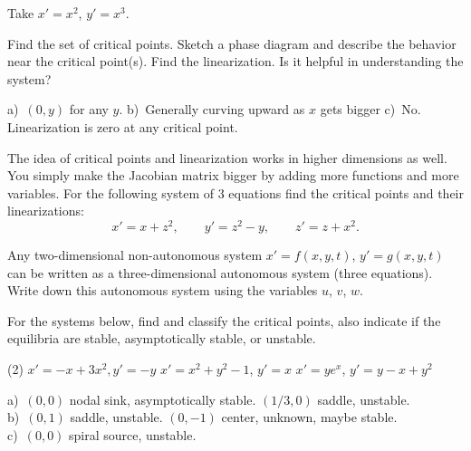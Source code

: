 \begin{exercise}
Take $x'=x^2$, \enspace $y'=x^3$.
\begin{tasks}
\task Find the set of critical points.
\task Sketch a phase diagram and describe the behavior near the critical
point(s).
\task Find the linearization.  Is it helpful in understanding the system?
\end{tasks}
\end{exercise}
\comboSol{%
}
{%
a)~$(0,y)$ for any $y$. \quad b)~Generally curving upward as $x$ gets bigger \quad c)~No. Linearization is zero at any critical point.
}

\begin{samepage}
\begin{exercise}\ansMark%
The idea of critical points and linearization works in higher dimensions as
well.  You simply make the Jacobian matrix bigger by adding more functions
and more variables.  For the following system
of 3 equations find the critical points and their linearizations:
\begin{equation*}
x' = x + z^2, \qquad y' = z^2-y, \qquad z' = z+x^2.
\end{equation*}
\end{exercise}
\end{samepage}

\begin{exercise}\ansMark%
Any two-dimensional non-autonomous system $x'=f(x,y,t)$, $y'=g(x,y,t)$ can
be written as a three-dimensional autonomous system (three equations).  Write down this
autonomous system using the variables $u$, $v$, $w$.
\end{exercise}

\begin{exercise}
For the systems below, find and classify the critical points, also indicate
if the equilibria are stable, asymptotically stable, or unstable.
\begin{tasks}(2)
\task $x'=-x+3x^2, y'=-y$
\task $x'=x^2+y^2-1$, $y'=x$
\task $x'=ye^x$, $y'=y-x+y^2$
\end{tasks}
\end{exercise}
\comboSol{%
}
{%
a)~$(0,0)$ nodal sink, asymptotically stable. $(1/3, 0)$ saddle, unstable.\\
b)~$(0,1)$ saddle, unstable. $(0, -1)$ center, unknown, maybe stable. \\
c)~$(0,0)$ spiral source, unstable. 
}

